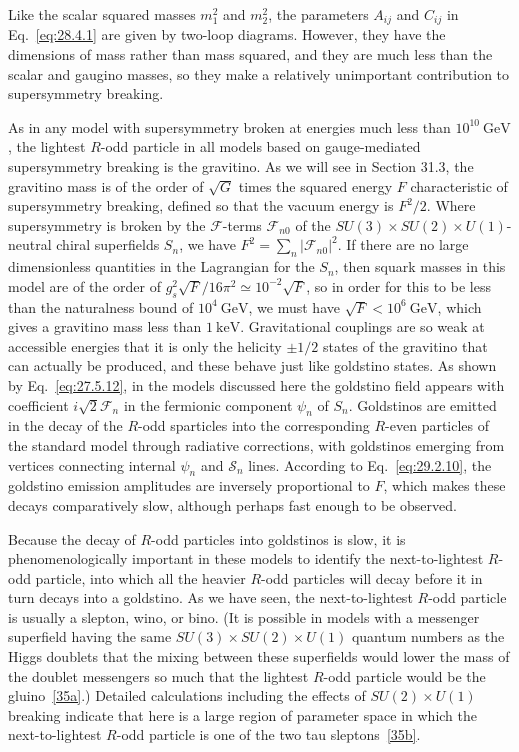 Like the scalar squared masses \(m_1^2\) and \(m_2^2\), the parameters
\(A_{ij}\) and \(C_{ij}\) in Eq.~\eqref{eq:28.4.1} are given by two-loop
diagrams. However, they have the dimensions of mass rather than mass
squared, and they are much less than the scalar and gaugino masses, so
they make a relatively unimportant contribution to supersymmetry breaking.

As in any model with supersymmetry broken at energies much less than
\(10^{10}\ \mathrm{GeV}\), the lightest \(R\)-odd particle in all models
based on gauge-mediated supersymmetry breaking is the gravitino. As we
will see in Section 31.3, the gravitino mass is of the order of
\(\sqrt{G}\) times the squared energy \(F\) characteristic of
supersymmetry breaking, defined so that the vacuum energy is \(F^2/2\).
Where supersymmetry is broken by the \(\mathcal{F}\)-terms
\(\mathcal{F}_{n0}\) of the
\(SU(3)\times SU(2)\times U(1)\)-neutral chiral
superfields \(S_n\), we have
\(F^2=\sum_n\lvert\mathcal{F}_{n0}\rvert^2\). If there are no large
dimensionless quantities in the Lagrangian for the \(S_n\), then squark
masses in this model are of the order of
\(g_s^2\sqrt{F}/16\pi^2\simeq10^{-2}\sqrt{F}\), so in order for this to
be less than the naturalness bound of \(10^4\ \mathrm{GeV}\), we must have
\(\sqrt{F}<10^6\ \mathrm{GeV}\), which gives a gravitino mass less than
\(1\ \mathrm{keV}\). Gravitational couplings are so weak at accessible
energies that it is only the helicity \(\pm1/2\) states of the gravitino
that can actually be produced, and these behave just like goldstino
states. As shown by Eq.~\eqref{eq:27.5.12}, in the models discussed here
the goldstino field appears with coefficient \(i\sqrt{2}\mathcal{F}_n\)
in the fermionic component \(\psi_n\) of \(S_n\). Goldstinos are emitted
in the decay of the \(R\)-odd sparticles into the corresponding \(R\)-even
particles of the standard model through radiative corrections, with
goldstinos emerging from vertices connecting internal \(\psi_n\) and
\(\mathcal{S}_n\) lines. According to Eq.~\eqref{eq:29.2.10}, the
goldstino emission amplitudes are inversely proportional to \(F\), which
makes these decays comparatively slow, although perhaps fast enough to be
observed.

Because the decay of \(R\)-odd particles into goldstinos is slow, it is
phenomenologically important in these models to identify the
next-to-lightest \(R\)-odd particle, into which all the heavier \(R\)-odd
particles will decay before it in turn decays into a goldstino. As we have
seen, the next-to-lightest \(R\)-odd particle is usually a slepton, wino,
or bino. (It is possible in models with a messenger superfield having the
same \(SU(3)\times SU(2)\times U(1)\) quantum numbers as
the Higgs doublets that the mixing between these superfields would lower
the mass of the doublet messengers so much that the lightest \(R\)-odd
particle would be the gluino~\hyperref[ch28-ref-35a]{[35a]}.) Detailed
calculations including the effects of \(SU(2)\times U(1)\)
breaking indicate that here is a large region of parameter space in which
the next-to-lightest \(R\)-odd particle is one of the two tau
sleptons~\hyperref[ch28-ref-35b]{[35b]}.
